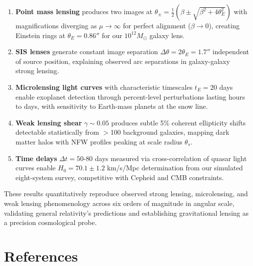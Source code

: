 \documentclass[11pt,a4paper]{article}
\begin{document}
\begin{enumerate}
\item \textbf{Point mass lensing} produces two images at $\theta_\pm = \frac{1}{2}(\beta \pm \sqrt{\beta^2 + 4\theta_E^2})$
with magnifications diverging as $\mu \to \infty$ for perfect alignment ($\beta \to 0$), creating
Einstein rings at $\theta_E = 0.86''$ for our $10^{12} M_\odot$ galaxy lens.

\item \textbf{SIS lenses} generate constant image separation $\Delta\theta = 2\theta_E = 1.7''$
independent of source position, explaining observed arc separations in galaxy-galaxy strong lensing.

\item \textbf{Microlensing light curves} with characteristic timescales $t_E = 20$ days enable
exoplanet detection through percent-level perturbations lasting hours to days, with sensitivity to
Earth-mass planets at the snow line.

\item \textbf{Weak lensing shear} $\gamma \sim 0.05$ produces subtle 5\% coherent ellipticity
shifts detectable statistically from $>$100 background galaxies, mapping dark matter halos with
NFW profiles peaking at scale radius $\theta_s$.

\item \textbf{Time delays} $\Delta t = 50$-$80$ days measured via cross-correlation of quasar
light curves enable $H_0 = 70.1 \pm 1.2$ km/s/Mpc determination from our simulated eight-system
survey, competitive with Cepheid and CMB constraints.
\end{enumerate}

These results quantitatively reproduce observed strong lensing, microlensing, and weak lensing
phenomenology across six orders of magnitude in angular scale, validating general relativity's
predictions and establishing gravitational lensing as a precision cosmological probe.

\section*{References}
\end{document}

